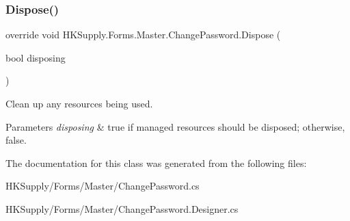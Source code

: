\subsubsection{\texorpdfstring{Dispose()}{Dispose()}}
{\footnotesize\ttfamily override void H\+K\+Supply.\+Forms.\+Master.\+Change\+Password.\+Dispose (\begin{DoxyParamCaption}\item[{bool}]{disposing }\end{DoxyParamCaption})\hspace{0.3cm}{\ttfamily [protected]}}



Clean up any resources being used. 


\begin{DoxyParams}{Parameters}
{\em disposing} & true if managed resources should be disposed; otherwise, false.\\
\hline
\end{DoxyParams}


The documentation for this class was generated from the following files\+:\begin{DoxyCompactItemize}
\item 
H\+K\+Supply/\+Forms/\+Master/Change\+Password.\+cs\item 
H\+K\+Supply/\+Forms/\+Master/Change\+Password.\+Designer.\+cs\end{DoxyCompactItemize}
